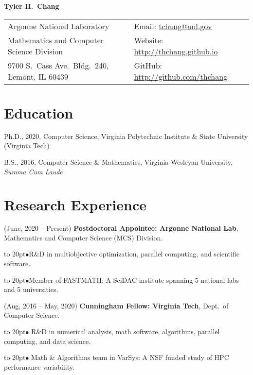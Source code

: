 \documentclass[11pt]{article}
\def\bullitem{\par\hangindent=15pt \hangafter=1
\noindent\hbox to 20pt{\hfil$\bullet$\hfil}\ignorespaces}
\begin{document}
{\large \textbf{Tyler H.\ Chang}}

\begin{tabular}{ll}
   Argonne National Laboratory
      & Email: \href{mailto:tchang@anl.gov}{tchang@anl.gov}\\
   Mathematics and Computer Science Division
      & Website: \url{http://thchang.github.io}\\
   9700 S.\ Cass Ave.\ Bldg.\ 240, Lemont, IL 60439
      & GitHub: \url{http://github.com/thchang} \\
\end{tabular}

%

\section*{Education}

Ph.D., 2020, Computer Science,
Virginia Polytechnic Institute \& State University
(Virginia Tech)

\medskip

B.S., 2016, Computer Science \& Mathematics,
Virginia Wesleyan University, \textit{Summa Cum Laude}

\section*{Research Experience}

\hangindent=0.3in
(June, 2020 -- Present)
\textbf{Postdoctoral Appointee: Argonne National Lab},
Mathematics and Computer Science (MCS) Division.
\bullitem R\&D in multiobjective optimization, parallel computing, and
scientific software.
\bullitem Member of FASTMATH: A SciDAC institute spanning
5 national labs and 5 universities.

\medskip

\hangindent=0.3in
(Aug, 2016 -- May, 2020)
\textbf{Cunningham Fellow: Virginia Tech},
Dept.\ of Computer Science.
\bullitem
R\&D in numerical analysis, math software,
algorithms, parallel computing, and data science.
\bullitem
Math \& Algorithms team in VarSys: A NSF funded study of
HPC performance variability.

\medskip
\end{document}
